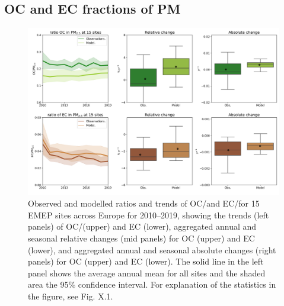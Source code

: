 


\subsection{OC and EC fractions of PM}
\label{ss:OCECfrac}


\begin{figure}
\includegraphics[width=16cm]{FIGS_TRENDS/ECOC_ratio_trends.png}
 \caption{Observed and modelled ratios and trends of OC/\pmfine and EC/\pmfine for
  15 EMEP sites across Europe for 2010--2019, showing the trends
  (left panels) of OC/\pmfine (upper) and EC (lower), aggregated annual and
  seasonal relative changes (mid panels) for OC (upper) and EC (lower),
  and aggregated annual and seasonal absolute changes (right panels)
  for OC (upper) and EC (lower). The solid line in the left panel shows
  the average annual mean for all sites and the shaded area the 95\%
  confidence interval. For explanation of the statistics in the figure,
  see Fig. X.1. \label{fig:KEX3}
 }
\end{figure}


